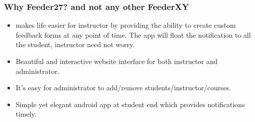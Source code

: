 \documentclass{beamer}
\begin{document}
\begin{frame}
\frametitle{Why Feeder27? and not  any  other FeederXY}
\begin{itemize}
    \item makes life easier for instructor by providing the ability to create custom feedback forms at any point of time. The app will float the notification to all the student, instructor need not worry.
    \item Beautiful and interactive website interface for both instructor and administrator.
    \item It's easy for administrator to add/remove students/instructor/courses.
    \item Simple yet elegant android app at student end which provides notifications timely.
\end{itemize}
\end{frame}
 
\end{document}
